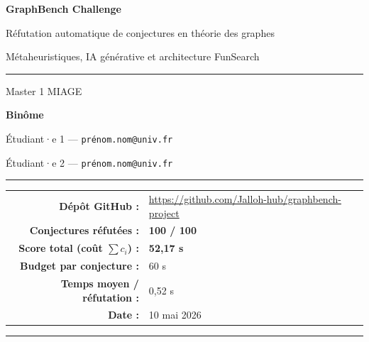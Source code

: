 \documentclass[11pt,a4paper]{article}
\begin{document}
\begin{titlepage}
\centering
\vspace*{2.5cm}
{\Huge\bfseries GraphBench Challenge\par}
\vspace{0.7cm}
{\Large Réfutation automatique de conjectures en théorie des graphes\par}
\vspace{0.4cm}
{\large Métaheuristiques, IA générative et architecture FunSearch\par}

\vspace{2.0cm}
\rule{0.6\linewidth}{0.5pt}\par
\vspace{0.8cm}

{\Large Master 1 MIAGE \par}
\vspace{0.5cm}
{\large \textbf{Binôme} \par}
\vspace{0.2cm}
{\large Étudiant·e 1 — \texttt{prénom.nom@univ.fr} \par}
{\large Étudiant·e 2 — \texttt{prénom.nom@univ.fr} \par}

\vspace{1.4cm}
\rule{0.6\linewidth}{0.5pt}\par
\vspace{1.0cm}

\begin{tabular}{rl}
  \textbf{Dépôt GitHub :} &
    \url{https://github.com/Jalloh-hub/graphbench-project} \\[2pt]
  \textbf{Conjectures réfutées :} & \textbf{100 / 100} \\[2pt]
  \textbf{Score total (coût $\sum c_i$) :} & \textbf{52{,}17 s} \\[2pt]
  \textbf{Budget par conjecture :} & 60 s \\[2pt]
  \textbf{Temps moyen / réfutation :} & 0{,}52 s \\[2pt]
  \textbf{Date :} & 10 mai 2026 \\
\end{tabular}

\vfill
\end{titlepage}

\tableofcontents
\vspace{0.5cm}
\hrule
\vspace{0.5cm}
\end{document}
